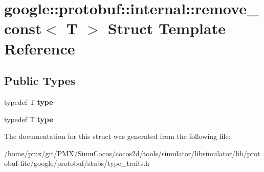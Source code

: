 \hypertarget{structgoogle_1_1protobuf_1_1internal_1_1remove__const}{}\section{google\+:\+:protobuf\+:\+:internal\+:\+:remove\+\_\+const$<$ T $>$ Struct Template Reference}
\label{structgoogle_1_1protobuf_1_1internal_1_1remove__const}
\subsection*{Public Types}
\begin{DoxyCompactItemize}
\item 
\mbox{\label{structgoogle_1_1protobuf_1_1internal_1_1remove__const_ad937075f50ff588142c771891bc21ae9}} 
typedef T {\bfseries type}
\item 
\mbox{\label{structgoogle_1_1protobuf_1_1internal_1_1remove__const_ad937075f50ff588142c771891bc21ae9}} 
typedef T {\bfseries type}
\end{DoxyCompactItemize}


The documentation for this struct was generated from the following file\+:\begin{DoxyCompactItemize}
\item 
/home/pmx/git/\+P\+M\+X/\+Simu\+Cocos/cocos2d/tools/simulator/libsimulator/lib/protobuf-\/lite/google/protobuf/stubs/type\+\_\+traits.\+h\end{DoxyCompactItemize}
